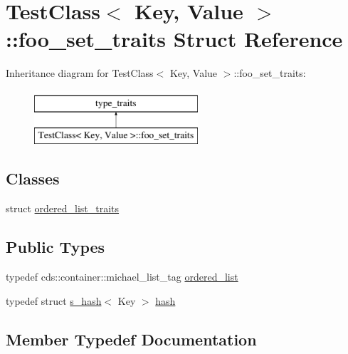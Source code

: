 \hypertarget{struct_test_class_1_1foo__set__traits}{}\section{Test\+Class$<$ Key, Value $>$\+:\+:foo\+\_\+set\+\_\+traits Struct Reference}
\label{struct_test_class_1_1foo__set__traits}
Inheritance diagram for Test\+Class$<$ Key, Value $>$\+:\+:foo\+\_\+set\+\_\+traits\+:\begin{figure}[H]
\begin{center}
\leavevmode
\includegraphics[height=2.000000cm]{struct_test_class_1_1foo__set__traits}
\end{center}
\end{figure}
\subsection*{Classes}
\begin{DoxyCompactItemize}
\item 
struct \hyperlink{struct_test_class_1_1foo__set__traits_1_1ordered__list__traits}{ordered\+\_\+list\+\_\+traits}
\end{DoxyCompactItemize}
\subsection*{Public Types}
\begin{DoxyCompactItemize}
\item 
typedef cds\+::container\+::michael\+\_\+list\+\_\+tag \hyperlink{struct_test_class_1_1foo__set__traits_a9cbc3585bd646618faf9f6a28d5a1133}{ordered\+\_\+list}
\item 
typedef struct \hyperlink{struct_test_class_1_1s__hash}{s\+\_\+hash}$<$ Key $>$ \hyperlink{struct_test_class_1_1foo__set__traits_a5e8da11bd322076d626508eb728c8518}{hash}
\end{DoxyCompactItemize}


\subsection{Member Typedef Documentation}
\hypertarget{struct_test_class_1_1foo__set__traits_a5e8da11bd322076d626508eb728c8518}{}
